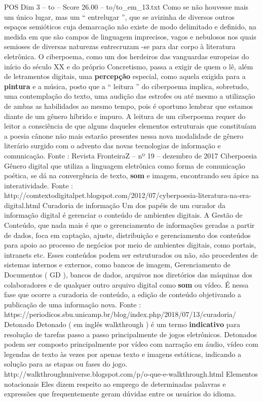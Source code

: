 \begin{textsample}{POS Dim 3 – to – Score 26.00 – to/to\_em\_13.txt}
Como se não houvesse mais um único lugar, mas um “ entrelugar ”, que se avizinha de diversos outros espaços semióticos cuja demarcação não existe de modo delimitado e definido, na medida em que são campos de linguagem imprecisos, vagos e nebulosos nos quais semioses de diversas naturezas entrecruzam -se para dar corpo à literatura eletrônica.
O ciberpoema, como um dos herdeiros das vanguardas europeias do início do século XX e do próprio Concretismo, passa a exigir de quem o lê, além de letramentos digitais, uma \textbf{percepção} especial, como aquela exigida para a \textbf{pintura} e a música, posto que a “ leitura ” do ciberpoema implica, sobretudo, uma contemplação do texto, uma audição das estrofes ou até mesmo a utilização de ambas as habilidades ao mesmo tempo, pois é oportuno lembrar que estamos diante de um gênero híbrido e impuro.
A leitura de um ciberpoema requer do leitor a consciência de que alguns daqueles elementos estruturais que constituíam a poesia cânone não mais estarão presentes nessa nova modalidade de gênero literário surgido com o advento das novas tecnologias de informação e comunicação.
Fonte : Revista FronteiraZ – nº 19 – dezembro de 2017 Ciberpoesia Gênero digital que utiliza a linguagem eletrônica como forma de comunicação poética, se dá na convergência de texto, \textbf{som} e imagem, encontrando seu ápice na interatividade.
Fonte : http://comtextodigitalpet.blogspot.com/2012/07/cyberpoesia-literatura-na-era-digital.html Curadoria de informação Um dos papéis de um curador da informação digital é gerenciar o conteúdo de ambientes digitais.
A Gestão de Conteúdo, que nada mais é que o gerenciamento de informações geradas a partir de dados, foca em captação, ajuste, distribuição e gerenciamento dos conteúdos para apoio ao processo de negócios por meio de ambientes digitais, como portais, intranets etc.
Esses conteúdos podem ser estruturados ou não, são procedentes de sistemas internos e externos, como bancos de imagem, Gerenciamento de Documentos ( GD ), bancos de dados, arquivos nos diretórios das máquinas dos colaboradores e de qualquer outro arquivo digital como \textbf{som} ou vídeo.
É nessa fase que ocorre a curadoria de conteúdo, a edição de conteúdo objetivando a publicação de uma informação nova.
Fonte : https://periodicos.sbu.unicamp.br/blog/index.php/2018/07/13/curadoria/ Detonado Detonado ( em inglês walkthrough ) é um termo \textbf{indicativo} para resolução de tarefas passo a passo principalmente de jogos eletrônicos.
Detonados podem ser composto principalmente por vídeo com narração em áudio, vídeo com legendas de texto às vezes por apenas texto e imagens estáticas, indicando a solução para as etapas ou fases do jogo. http://walkthroughuniverse.blogspot.com/p/o-que-e-walkthrough.html Elementos notacionais Eles dizem respeito ao emprego de determinadas palavras e expressões que frequentemente geram dúvidas entre os usuários do idioma.

\end{textsample}
